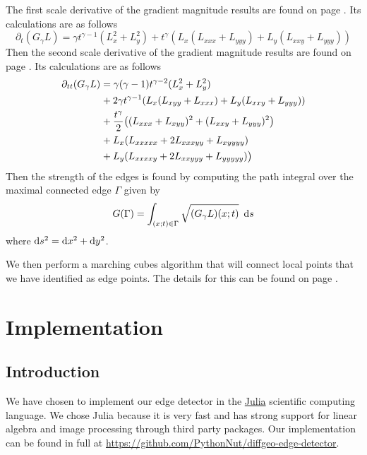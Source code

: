 \documentclass{article}
\begin{document}
The first scale derivative of the gradient magnitude results are found on page \pageref{t_tgma}. 
Its calculations are as follows \cite{Lindeberg1998}
\begin{equation} \label{dtGl}
  \partial_t (G_{\gamma}L) = \gamma t^{\gamma-1}(L_x^2+L_y^2) + t^{\gamma}(L_x(L_{xxx}+L_{yyy})+L_y(L_{xxy} + L_{yyy}))
\end{equation}
Then the second scale derivative of the gradient magnitude results are found on page \pageref{t_ttgma}.
Its calculations are as follows \cite{Lindeberg1998}
\begin{equation}
  \begin{aligned}
    \partial_{tt}(G_{\gamma}L) &= \gamma(\gamma-1)t^{\gamma-2}(L_x^2+L_y^2) \\
     & \hspace{.5pt}+ 2\gamma t^{\gamma-1}(L_x(L_{xyy}+L_{xxx})+L_y(L_{xxy}+L_{yyy})) \\
     & \hspace{.5pt}+\frac{t^{\gamma}}{2}\big((L_{xxx}+L_{xyy})^2+(L_{xxy}+L_{yyy})^2\big) \\
     & \hspace{.5pt}+ L_x(L_{xxxxx}+2L_{xxxyy}+L_{xyyyy}) \\
     & \hspace{.5pt}+ L_y(L_{xxxxy}+2L_{xxyyy}+L_{yyyyy})\big)
  \end{aligned}
\end{equation}
Then the strength of the edges is found by computing the path integral over the maximal connected edge $\Gamma$ given by \cite{Lindeberg1998}
\begin{equation}
  G(\Gamma) = \int_{(x;t) \in \Gamma} \sqrt{(G_{\gamma}L)(x;t)} \,\, \operatorname{d \!} s
\end{equation}
where $\operatorname{d \!} s^2=\operatorname{d \!} x^2+\operatorname{d \!} y^2$.

We then perform a marching cubes algorithm that will connect local points that we have identified as edge points. The details for this can be found on page \pageref{mcube}.

\section{Implementation}

\subsection{Introduction}

We have chosen to implement our edge detector in the \href{https://julialang.org/}{Julia} scientific computing language.
We chose Julia because it is very fast and has strong support for linear algebra and image processing through third party packages.
Our implementation can be found in full at \url{https://github.com/PythonNut/diffgeo-edge-detector}.
\end{document}

